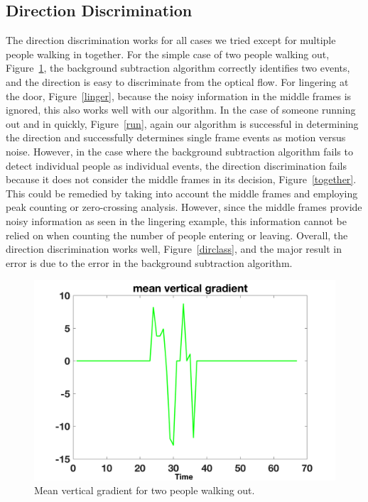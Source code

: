 \documentclass[12pt,oneside]{article} %
\begin{document}
\subsection{Direction Discrimination}  %
The direction discrimination works for all cases we tried except for multiple people walking in together. For the simple case of two people walking out, Figure~\ref{twoout}, the background subtraction algorithm correctly identifies two events, and the direction is easy to discriminate from the optical flow. For lingering at the door, Figure~\ref{linger}, because the noisy information in the middle frames is ignored, this also works well with our algorithm. In the case of someone running out and in quickly, Figure~\ref{run}, again our algorithm is successful in determining the direction and successfully determines single frame events as motion versus noise. However, in the case where the background subtraction algorithm fails to detect individual people as individual events, the direction discrimination fails because it does not consider the middle frames in its decision, Figure~\ref{together}. This could be remedied by taking into account the middle frames and employing peak counting or zero-crossing analysis. However, since the middle frames provide noisy information as seen in the lingering example, this information cannot be relied on when counting the number of people entering or leaving. Overall, the direction discrimination works well, Figure~\ref{dirclass}, and the major result in error is due to the error in the background subtraction algorithm.

\begin{figure}[htb]
\centering
\includegraphics[scale=0.52]{images/two_out.png}
\caption{Mean vertical gradient for two people walking out.}
\label{twoout}
\end{figure}
\end{document}
